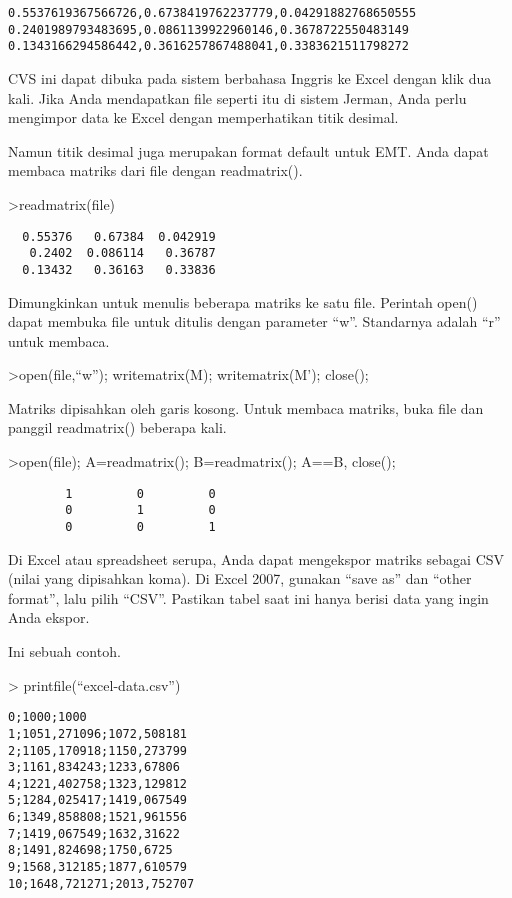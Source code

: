 \documentclass[
]{book}
\begin{document}
\begin{verbatim}
0.5537619367566726,0.6738419762237779,0.04291882768650555
0.2401989793483695,0.0861139922960146,0.3678722550483149
0.1343166294586442,0.3616257867488041,0.3383621511798272
\end{verbatim}

CVS ini dapat dibuka pada sistem berbahasa Inggris ke Excel dengan klik dua kali. Jika Anda mendapatkan file seperti itu di sistem Jerman, Anda perlu mengimpor data ke Excel dengan memperhatikan titik desimal.

Namun titik desimal juga merupakan format default untuk EMT. Anda dapat membaca matriks dari file dengan readmatrix().

\textgreater readmatrix(file)

\begin{verbatim}
  0.55376   0.67384  0.042919 
   0.2402  0.086114   0.36787 
  0.13432   0.36163   0.33836 
\end{verbatim}

Dimungkinkan untuk menulis beberapa matriks ke satu file. Perintah open() dapat membuka file untuk ditulis dengan parameter ``w''. Standarnya adalah ``r'' untuk membaca.

\textgreater open(file,``w''); writematrix(M); writematrix(M'); close();

Matriks dipisahkan oleh garis kosong. Untuk membaca matriks, buka file dan panggil readmatrix() beberapa kali.

\textgreater open(file); A=readmatrix(); B=readmatrix(); A==B, close();

\begin{verbatim}
        1         0         0 
        0         1         0 
        0         0         1 
\end{verbatim}

Di Excel atau spreadsheet serupa, Anda dapat mengekspor matriks sebagai CSV (nilai yang dipisahkan koma). Di Excel 2007, gunakan ``save as'' dan ``other format'', lalu pilih ``CSV''. Pastikan tabel saat ini hanya berisi data yang ingin Anda ekspor.

Ini sebuah contoh.

\textgreater{} printfile(``excel-data.csv'')

\begin{verbatim}
0;1000;1000
1;1051,271096;1072,508181
2;1105,170918;1150,273799
3;1161,834243;1233,67806
4;1221,402758;1323,129812
5;1284,025417;1419,067549
6;1349,858808;1521,961556
7;1419,067549;1632,31622
8;1491,824698;1750,6725
9;1568,312185;1877,610579
10;1648,721271;2013,752707
\end{verbatim}
\end{document}
